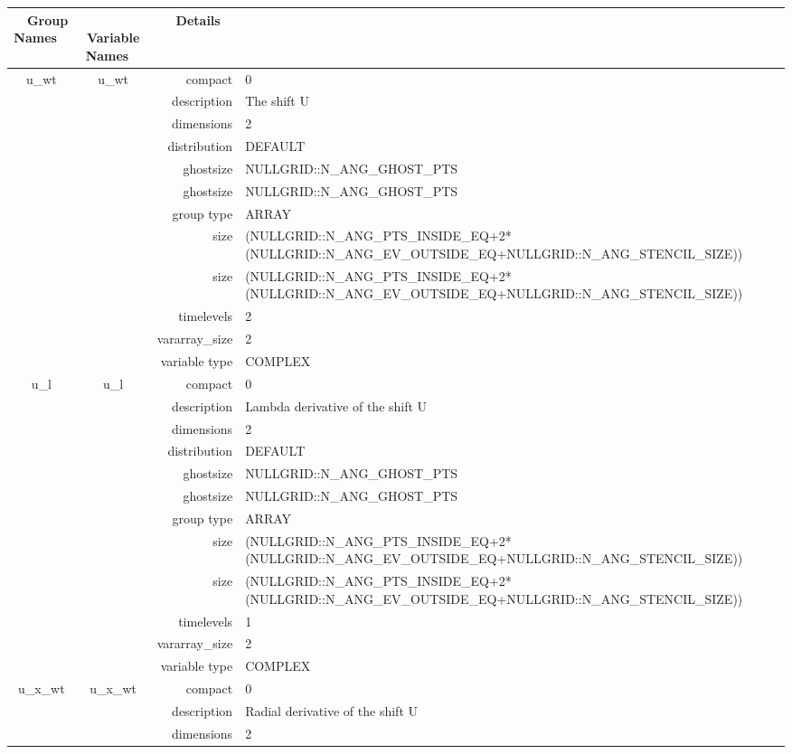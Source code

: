 \begin{tabular*}{150mm}{|c|c@{\extracolsep{\fill}}|rl|} \hline 
~ {\bf Group Names} ~ & ~ {\bf Variable Names} ~  &{\bf Details} ~ & ~ \\ 
\hline 
u\_wt & u\_wt & compact & 0 \\ 
 &  & description & The shift U \\ 
 &  & dimensions & 2 \\ 
 &  & distribution & DEFAULT \\ 
 &  & ghostsize & NULLGRID::N\_ANG\_GHOST\_PTS \\ 
& ~ & ghostsize & NULLGRID::N\_ANG\_GHOST\_PTS \\ 
 &  & group type & ARRAY \\ 
 &  & size & (NULLGRID::N\_ANG\_PTS\_INSIDE\_EQ+2*(NULLGRID::N\_ANG\_EV\_OUTSIDE\_EQ+NULLGRID::N\_ANG\_STENCIL\_SIZE)) \\ 
& ~ & size & (NULLGRID::N\_ANG\_PTS\_INSIDE\_EQ+2*(NULLGRID::N\_ANG\_EV\_OUTSIDE\_EQ+NULLGRID::N\_ANG\_STENCIL\_SIZE)) \\ 
 &  & timelevels & 2 \\ 
 &  & vararray\_size & 2 \\ 
 &  & variable type & COMPLEX \\ 
\hline 
u\_l & u\_l & compact & 0 \\ 
 &  & description & Lambda derivative of the shift U \\ 
 &  & dimensions & 2 \\ 
 &  & distribution & DEFAULT \\ 
 &  & ghostsize & NULLGRID::N\_ANG\_GHOST\_PTS \\ 
& ~ & ghostsize & NULLGRID::N\_ANG\_GHOST\_PTS \\ 
 &  & group type & ARRAY \\ 
 &  & size & (NULLGRID::N\_ANG\_PTS\_INSIDE\_EQ+2*(NULLGRID::N\_ANG\_EV\_OUTSIDE\_EQ+NULLGRID::N\_ANG\_STENCIL\_SIZE)) \\ 
& ~ & size & (NULLGRID::N\_ANG\_PTS\_INSIDE\_EQ+2*(NULLGRID::N\_ANG\_EV\_OUTSIDE\_EQ+NULLGRID::N\_ANG\_STENCIL\_SIZE)) \\ 
 &  & timelevels & 1 \\ 
 &  & vararray\_size & 2 \\ 
 &  & variable type & COMPLEX \\ 
\hline 
u\_x\_wt & u\_x\_wt & compact & 0 \\ 
 &  & description & Radial derivative of the shift U \\ 
 &  & dimensions & 2 \\ 

\end{tabular*}
